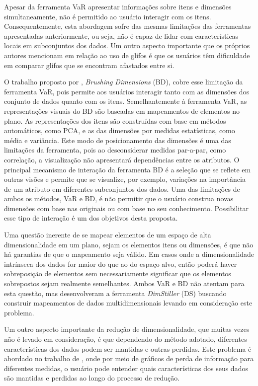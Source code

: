 Apesar da ferramenta VaR apresentar informações sobre itens
e dimensões simultaneamente, não é permitido ao usuário
interagir com os itens. Consequentemente, esta abordagem
sofre das mesmas limitações das ferramentas apresentadas
anteriormente, ou seja, não é capaz de lidar com  
características locais em subconjuntos dos dados. Um outro
aspecto importante que os próprios autores mencionam em
relação ao uso de glifos é que os usuários têm dificuldade
em comparar glifos que se encontram afastados entre si. 

O trabalho proposto por \citet{Turkay2011}, \emph{Brushing
Dimensions} (BD), cobre esse limitação da ferramenta VaR,
pois permite aos usuários interagir tanto com as dimensões
dos conjunto de dados quanto com os itens. Semelhantemente à
ferramenta VaR, as representações visuais do BD são baseadas
em mapeamentos de elementos no plano. As representações dos
itens são construídas com base em métodos automáticos, como
PCA, e as das dimensões por medidas estatísticas, como média
e variância. Este modo de posicionamento das dimensões é uma
das limitações da ferramenta, pois ao desconsiderar medidas
par-a-par, como correlação, a visualização não apresentará
dependências entre os atributos. O principal mecanismo de
interação da ferramenta BD é a seleção que se reflete em
outras visões e permite que se visualize, por exemplo,
variações na importância de um atributo em diferentes
subconjuntos dos dados. Uma das limitações de ambos os
métodos, VaR e BD, é não permitir que o usuário construa
novas dimensões com base nas originais ou
com base no seu conhecimento. Possibilitar esse tipo de
interação é um dos objetivos desta proposta.

Uma questão inerente de se mapear elementos de um espaço de
alta dimensionalidade em um plano, sejam os elementos itens
ou dimensões, é que não há garantias de que o mapeamento
seja válido. Em casos onde a dimensionalidade intrínseca dos
dados for maior do que ao do espaço alvo, então poderá haver
sobreposição de elementos sem necessariamente significar que
os elementos sobrepostos sejam realmente semelhantes. Ambos
VaR e BD não atentam para esta questão, mas
\citet{Ingram2010} desenvolveram a ferramenta
\emph{DimStiller} (DS) buscando construir mapeamentos de
dados multidimensionais levando em consideração este
problema. 

Um outro aspecto importante da redução de dimensionalidade,
que muitas vezes não é levado em consideração, é que
dependendo do método adotado, diferentes características dos
dados podem ser mantidas e outras perdidas. Este problema é
abordado no trabalho de \citet{Johansson2009}, onde por meio
de gráficos de perda de informação para diferentes medidas,
o usuário pode entender quais características dos seus dados
são mantidas e perdidas ao longo do processo de redução. 

